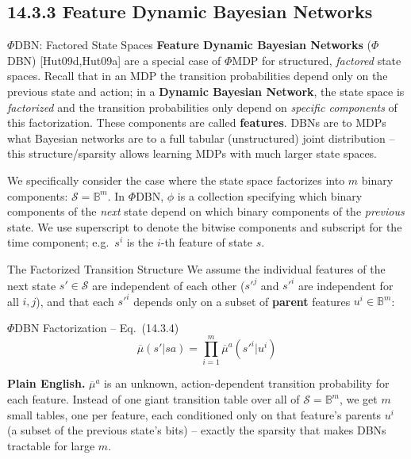 \documentclass[aspectratio=169,10pt]{beamer}
\newcommand{\B}{\mathbb{B}}
\newcommand{\Sc}{\mathcal{S}}
\begin{document}
\subsection{14.3.3 Feature Dynamic Bayesian Networks}

\begin{frame}{$\Phi$DBN: Factored State Spaces}
  \textbf{Feature Dynamic Bayesian Networks} ($\Phi$DBN) [Hut09d,Hut09a]
  are a special case of $\Phi$MDP for structured, \emph{factored} state
  spaces. Recall that in an MDP the transition probabilities depend only
  on the previous state and action; in a \textbf{Dynamic Bayesian
  Network}, the state space is \emph{factorized} and the transition
  probabilities only depend on \emph{specific components} of this
  factorization. These components are called \textbf{features}. DBNs are
  to MDPs what Bayesian networks are to a full tabular (unstructured)
  joint distribution -- this structure/sparsity allows learning MDPs with
  much larger state spaces.

  \vspace{0.4em}
  We specifically consider the case where the state space factorizes into
  $m$ binary components: $\Sc=\B^m$. In $\Phi$DBN, $\phi$ is a collection
  specifying which binary components of the \emph{next} state depend on
  which binary components of the \emph{previous} state. We use superscript
  to denote the bitwise components and subscript for the time component;
  e.g.\ $s^i$ is the $i$-th feature of state $s$.
\end{frame}

\begin{frame}{The Factorized Transition Structure}
  We assume the individual features of the next state $s'\in\Sc$ are
  independent of each other ($s'^j$ and $s'^i$ are independent for all
  $i,j$), and that each $s'^i$ depends only on a subset of \textbf{parent}
  features $u^i\in\B^m$:
  \begin{block}{$\Phi$DBN Factorization -- Eq.\ (14.3.4)}
    \[
      \overline\mu(s'|sa) = \prod_{i=1}^m \overline\mu^a(s'^i|u^i)
    \]
  \end{block}
  \textbf{Plain English.} $\overline\mu^a$ is an unknown, action-dependent
  transition probability for each feature. Instead of one giant transition
  table over all of $\Sc=\B^m$, we get $m$ small tables, one per feature,
  each conditioned only on that feature's parents $u^i$ (a subset of the
  previous state's bits) -- exactly the sparsity that makes DBNs tractable
  for large $m$.
\end{frame}
\end{document}
